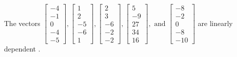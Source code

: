 \begin{exercise}
\begin{exerciseStatement}
  \end{exerciseStatement}
  \begin{exerciseAnswer}
   The vectors \(\left[\begin{array}{r}
-4 \\
-1 \\
0 \\
-4 \\
-5
\end{array}\right] , \left[\begin{array}{r}
1 \\
2 \\
-5 \\
-6 \\
1
\end{array}\right] , \left[\begin{array}{r}
2 \\
3 \\
-6 \\
-2 \\
-2
\end{array}\right] , \left[\begin{array}{r}
5 \\
-9 \\
27 \\
34 \\
16
\end{array}\right] , \text{ and } \left[\begin{array}{r}
-8 \\
-2 \\
0 \\
-8 \\
-10
\end{array}\right]\) are 
  	 linearly dependent  .
  


  \end{exerciseAnswer}
\end{exercise}
